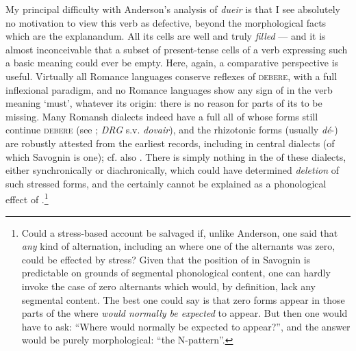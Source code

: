 \documentclass[output=paper,
modfonts
]{LSP/langsci}
\begin{document}
My principal difficulty with Anderson's analysis of \emph{dueir} is that
I see absolutely no motivation to view this verb as defective, beyond
the morphological facts which are the explanandum. All its cells are
well and truly \emph{filled} --- and it is almost inconceivable that a
subset of present-tense cells of a verb expressing such a basic meaning
could ever be empty. Here, again, a comparative perspective is useful.
Virtually all Romance languages conserve reflexes of \textsc{debere},
with a full inflexional paradigm, and no Romance languages show any sign
of  in the verb meaning `must', whatever its origin: there
is no reason for parts of its  to be missing. Many Romansh
dialects indeed have a full  all of whose forms still continue
\textsc{debere} (see \citealt[152f.]{decurtins1958a}; \emph{DRG} s.v.
\emph{dovair}), and the rhizotonic forms (usually \emph{dé}-) are
robustly attested from the earliest records, including in central
dialects (of which Savognin is one); cf. also \citet[30;32]{anderson2010a}.
There is simply nothing in the  of these dialects, either
synchronically or diachronically, which could have determined
\emph{deletion} of such stressed forms, and the  certainly
cannot be explained as a phonological effect of .\footnote{Could a
  stress-based account be salvaged if, unlike Anderson, one said that
  \emph{any} kind of alternation, including an  where one of
  the alternants was zero, could be effected by stress? Given that the
  position of  in Savognin is predictable on grounds of segmental
  phonological content, one can hardly invoke the case of zero
  alternants which would, by definition, lack any segmental content. The
  best one could say is that zero forms appear in those parts of the
   where  \emph{would normally be expected} to appear. But
  then one would have to ask: ``Where would  normally be expected
  to appear?'', and the answer would be purely morphological: ``the
  N-pattern''.}
\end{document}
